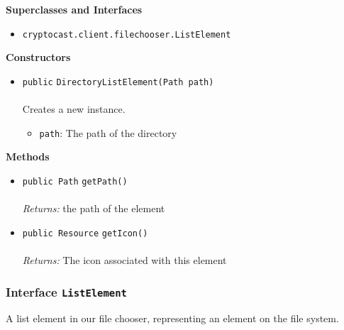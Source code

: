 \textbf{\sffamily Superclasses and Interfaces}
\begin{itemize}
\item \lstinline|cryptocast.client.filechooser.ListElement|
\end{itemize}


\textbf{\sffamily Constructors}
\begin{itemize}
\item \lstinline|public| \lstinline|DirectoryListElement|\lstinline|(Path path)|\\ \\[-0.6em]
Creates a new instance.
\begin{itemize}
\item \lstinline|path|: The path of the directory
\end{itemize}



\end{itemize}


\textbf{\sffamily Methods}
\begin{itemize}
\item \lstinline|public Path| \lstinline|getPath|\lstinline|()|\\ \\[-0.6em]
\emph{Returns:} the path of the element



\item \lstinline|public Resource| \lstinline|getIcon|\lstinline|()|\\ \\[-0.6em]
\emph{Returns:} The icon associated with this element



\end{itemize}

\subsubsection{Interface \lstinline|ListElement|}
A list element in our file chooser, representing an element on the file system. \\
\noindent\begin{minipage}[t]{5cm}
\vspace{0.3em}
\hspace*{2em}
\vspace{0.3em}
\end{minipage}





